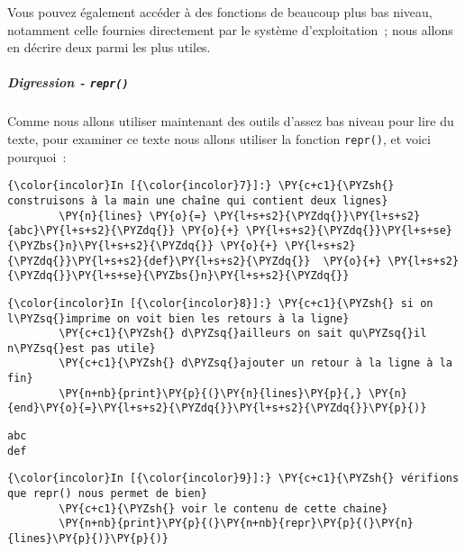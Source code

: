     Vous pouvez également accéder à des fonctions de beaucoup plus bas
niveau, notamment celle fournies directement par le système
d'exploitation~; nous allons en décrire deux parmi les plus utiles.

    \hypertarget{digression---repr}{%
\subparagraph{\texorpdfstring{Digression -
\texttt{repr()}}{Digression - repr()}}\label{digression---repr}}

    Comme nous allons utiliser maintenant des outils d'assez bas niveau pour
lire du texte, pour examiner ce texte nous allons utiliser la fonction
\texttt{repr()}, et voici pourquoi~:

    \begin{Verbatim}[commandchars=\\\{\}]
{\color{incolor}In [{\color{incolor}7}]:} \PY{c+c1}{\PYZsh{} construisons à la main une chaîne qui contient deux lignes}
        \PY{n}{lines} \PY{o}{=} \PY{l+s+s2}{\PYZdq{}}\PY{l+s+s2}{abc}\PY{l+s+s2}{\PYZdq{}} \PY{o}{+} \PY{l+s+s2}{\PYZdq{}}\PY{l+s+se}{\PYZbs{}n}\PY{l+s+s2}{\PYZdq{}} \PY{o}{+} \PY{l+s+s2}{\PYZdq{}}\PY{l+s+s2}{def}\PY{l+s+s2}{\PYZdq{}}  \PY{o}{+} \PY{l+s+s2}{\PYZdq{}}\PY{l+s+se}{\PYZbs{}n}\PY{l+s+s2}{\PYZdq{}}
\end{Verbatim}


    \begin{Verbatim}[commandchars=\\\{\}]
{\color{incolor}In [{\color{incolor}8}]:} \PY{c+c1}{\PYZsh{} si on l\PYZsq{}imprime on voit bien les retours à la ligne}
        \PY{c+c1}{\PYZsh{} d\PYZsq{}ailleurs on sait qu\PYZsq{}il n\PYZsq{}est pas utile}
        \PY{c+c1}{\PYZsh{} d\PYZsq{}ajouter un retour à la ligne à la fin}
        \PY{n+nb}{print}\PY{p}{(}\PY{n}{lines}\PY{p}{,} \PY{n}{end}\PY{o}{=}\PY{l+s+s2}{\PYZdq{}}\PY{l+s+s2}{\PYZdq{}}\PY{p}{)}
\end{Verbatim}


    \begin{Verbatim}[commandchars=\\\{\}]
abc
def

    \end{Verbatim}

    \begin{Verbatim}[commandchars=\\\{\}]
{\color{incolor}In [{\color{incolor}9}]:} \PY{c+c1}{\PYZsh{} vérifions que repr() nous permet de bien}
        \PY{c+c1}{\PYZsh{} voir le contenu de cette chaine}
        \PY{n+nb}{print}\PY{p}{(}\PY{n+nb}{repr}\PY{p}{(}\PY{n}{lines}\PY{p}{)}\PY{p}{)}
\end{Verbatim}


